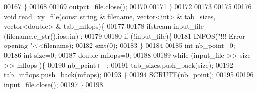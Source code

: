 \begin{DoxyCode}
00167     \}
00168   
00169   output\_file.close();
00170 
00171 \}
00172 
00173 
00175 
00176 \textcolor{keywordtype}{void} read\_xy\_file(\textcolor{keyword}{const} \textcolor{keywordtype}{string} & filename, vector<int> & tab\_sizes, vector<double> & tab\_mflops)\{
00177 
00178   ifstream input\_file (filename.c\_str(),ios::in) ;
00179 
00180   \textcolor{keywordflow}{if} (!input\_file)\{
00181     INFOS(\textcolor{stringliteral}{"!!! Error opening "}<<filename);
00182     exit(0);
00183   \}
00184   
00185   \textcolor{keywordtype}{int} nb\_point=0;
00186   \textcolor{keywordtype}{int} size=0;
00187   \textcolor{keywordtype}{double} mflops=0;
00188 
00189   \textcolor{keywordflow}{while} (input\_file >> size >> mflops )\{
00190     nb\_point++;
00191     tab\_sizes.push\_back(size);
00192     tab\_mflops.push\_back(mflops);
00193   \}
00194   SCRUTE(nb\_point);
00195 
00196   input\_file.close();
00197 \}
00198 
\end{DoxyCode}
